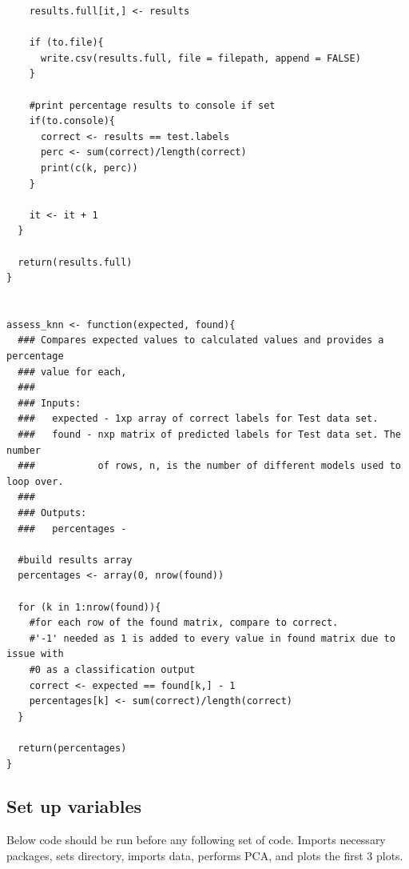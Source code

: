 \documentclass[11pt]{article} %
\begin{document}
\begin{lstlisting}
    results.full[it,] <- results
    
    if (to.file){
      write.csv(results.full, file = filepath, append = FALSE)
    }
    
    #print percentage results to console if set
    if(to.console){
      correct <- results == test.labels
      perc <- sum(correct)/length(correct) 
      print(c(k, perc))
    }
    
    it <- it + 1
  }
  
  return(results.full)
}


assess_knn <- function(expected, found){
  ### Compares expected values to calculated values and provides a percentage 
  ### value for each, 
  ###
  ### Inputs:
  ###   expected - 1xp array of correct labels for Test data set.
  ###   found - nxp matrix of predicted labels for Test data set. The number 
  ###           of rows, n, is the number of different models used to loop over.
  ###
  ### Outputs:
  ###   percentages - 
  
  #build results array
  percentages <- array(0, nrow(found))
  
  for (k in 1:nrow(found)){
    #for each row of the found matrix, compare to correct. 
    #'-1' needed as 1 is added to every value in found matrix due to issue with  
    #0 as a classification output
    correct <- expected == found[k,] - 1
    percentages[k] <- sum(correct)/length(correct)
  }
  
  return(percentages)
}

\end{lstlisting}

\subsection{Set up variables}
\label{code-vars}

Below code should be run before any following set of code. Imports necessary packages, sets directory, imports data, performs PCA, and plots the first 3 plots. 
\end{document}
